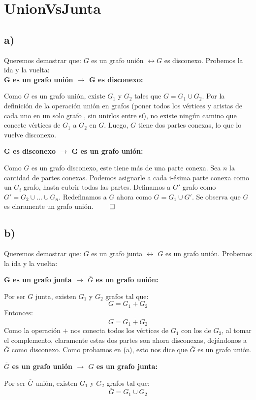 \documentclass{article}
\begin{document}
\section*{UnionVsJunta}

\subsection*{a)}
Queremos demostrar que: $G$ es un grafo unión $\leftrightarrow G$ es disconexo.
Probemos la ida y la vuelta:\\

\textbf{G es un grafo unión $\rightarrow$ G es disconexo:}

Como $G$ es un grafo unión, existe $G_1$ y $G_2$ tales que $G = G_1 \cup G_2$. Por la definición de la operación unión en grafos (poner todos los vértices y aristas de cada uno en un solo grafo , sin unirlos entre sí), no existe ningún camino que conecte vértices de $G_1$ a $G_2$ en $G$. Luego, $G$ tiene dos partes conexas, lo que lo vuelve disconexo.

\textbf{G es disconexo $\rightarrow$ G es un grafo unión:}

Como $G$ es un grafo disconexo, este tiene más de una parte conexa. Sea $n$ la cantidad de partes conexas. Podemos asignarle a cada i-ésima parte conexa como un $G_i$ grafo, hasta cubrir todas las partes. Definamos a $G'$ grafo como $G' = G_2 \cup ... \cup G_n$. Redefinamos a $G$ ahora como $G = G_1 \cup G'$. Se observa que $G$ es claramente un grafo unión. $\qed$
\subsection*{b)}
Queremos demostrar que: $G$ es un grafo junta $\leftrightarrow$ $\overline{G}$ es un grafo unión.
Probemos la ida y la vuelta:

\textbf{G es un grafo junta $\rightarrow$ $\overline{G}$ es un grafo unión:}

Por ser $G$ junta, existen $G_1$ y $G_2$ grafos tal que: 
\[G = G_1 + G_2\]
Entonces:
\[\overline{G} = \overline{G_1 + G_2}\]
Como la operación $+$ nos conecta todos los vértices de $G_1$ con los de $G_2$, al tomar el complemento, claramente estas dos partes son ahora disconexas, dejándonos a $\overline{G}$ como disconexo. Como probamos en (a), esto nos dice que $\overline{G}$ es un grafo unión.

\textbf{$\overline{G}$ es un grafo unión $\rightarrow$ $G$ es un grafo junta:}

Por ser $\overline{G}$ unión, existen $G_1$ y $G_2$ grafos tal que: 
\[\overline{G} = G_1 \cup G_2\]
\end{document}
